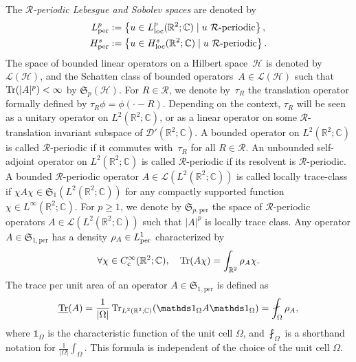 \documentclass[a4paper,11pt]{article}
\newcommand{\Schatten}{{\mathfrak S}}
\newcommand{\per}{\mathrm{per}}
\newcommand{\Trper}{\underline{\Tr}}
\theoremstyle{plain}
\theoremstyle{remark}
\def\R{{\mathbb R}}
\def\C{{\mathbb C}}
\def\cR{{\mathcal R}}
\def\1{{\mathds 1}}
\begin{document}
The {\it $\cR$-periodic Lebesgue and
Sobolev spaces} are denoted by
\begin{align*}
L^p_{\rm per}&:=\left\{ u \in L^p_{\rm loc}(\R^2;\C) \; | \; u \mbox{ $\cR$-periodic} \right\}, \\
H_{\rm per}^{s}&:=\left\{ u \in H_{\rm loc}^{s}(\R^2;\C) \; | \; u \mbox{ $\cR$-periodic} \right\}.
\end{align*}
The space of bounded linear operators on a Hilbert space~$\mathcal{H}$ is denoted by ${\mathcal L}(\mathcal{H})$, and the {Schatten class} of bounded operators~$A \in {\mathcal L}(\mathcal{H})$ such that $\Tr(|A|^p) < \infty$ by $\Schatten_{p}(\mathcal{H})$.
For $R \in \cR$, we denote by~$\tau_R$ the {translation operator} formally defined by $\tau_R \phi = \phi(\cdot - R)$. Depending on the context, $\tau_R$ will be seen as a unitary operator on $L^2(\R^2;\C)$, or as a linear operator on some $\cR$-translation invariant subspace of ${\mathcal D}'(\R^2;\C)$.
A bounded operator on $L^2(\R^2;\C)$ is called $\cR$-periodic if it commutes with~$\tau_R$ for all $R \in \cR$. An unbounded self-adjoint operator on $L^2(\R^2;\C)$ is called $\cR$-periodic if its resolvent is $\cR$-periodic. A bounded $\cR$-periodic operator $A \in {\mathcal L}(L^2(\R^2;\C))$ is called locally trace-class if $\chi A \chi \in \Schatten_{1}(L^2(\R^2;\C))$ for any compactly supported function $\chi \in L^\infty(\R^2;\C)$. For $p \ge 1$, we denote by $\Schatten_{p,\per}$ the space of $\cR$-periodic operators $A \in {\mathcal L}(L^2(\R^2;\C))$ such that $|A|^p$ is locally trace class. Any operator $A \in \Schatten_{1,\per}$ has a density $\rho_A \in L^1_{\rm per}$ characterized by
$$
\forall \chi \in C^\infty_{\rm c}(\R^2;\C), \quad \Tr(A\chi) = \int_{\R^2} \rho_A \chi.
$$
The trace per unit area of an operator $A \in \Schatten_{1,\per}$ is defined as
$$
\Trper(A) = \frac{1}{|\Omega|} \Tr_{L^2(\R^2;\C)}(\1_\Omega A \1_\Omega) =
\fint_{\Omega}  \rho_A,
$$
where $\1_\Omega$ is the characteristic function of the unit cell
$\Omega$, and $\fint_\Omega$ is a shorthand notation for $\frac 1
{|\Omega|} \int_{\Omega}$. This formula is independent of the choice
of the unit cell $\Omega$.


\medskip
\end{document}
